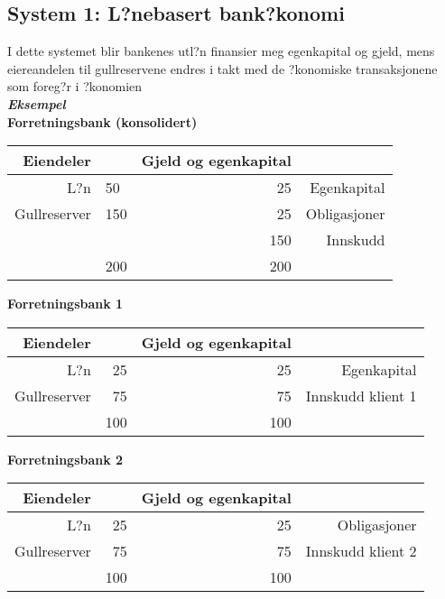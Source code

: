 \documentclass[a4paper,notitlepage]{article}
\begin{document}
\subsection{System 1: L?nebasert bank?konomi}
I dette systemet blir bankenes utl?n finansier meg egenkapital og gjeld, mens eiereandelen til gullreservene endres i takt med de ?konomiske transaksjonene som foreg?r i ?konomien  \\

\noindent\textbf{\emph{Eksempel}}\\
\textbf{Forretningsbank (konsolidert)}
\begin{center}\begin{tabular}{rlrr}
    \textbf{Eiendeler} & \textbf{} & \textbf{Gjeld og egenkapital} & \textbf{} \\
\hline    L?n   & 50    & 25    & Egenkapital \\
    Gullreserver  &  150   & 25    & Obligasjoner \\
          &       & 150   & Innskudd \\
\hline          & 200   & 200   &  \\
\end{tabular}%
\end{center}
\noindent \textbf{Forretningsbank 1}
\begin{center}
\begin{tabular}{rrrr}
    \textbf{Eiendeler} & \textbf{} & \textbf{Gjeld og egenkapital} & \textbf{} \\
\hline    L?n   & 25    & 25    & Egenkapital \\
    Gullreserver & 75    & 75    & Innskudd klient 1 \\
\hline          & 100    & 100    &  \\
\end{tabular}%
\end{center}
\noindent \textbf{Forretningsbank 2}
\begin{center}

\begin{tabular}{rrrr}
    \textbf{Eiendeler} & \textbf{} & \textbf{Gjeld og egenkapital} & \textbf{} \\
\hline    L?n   & 25    & 25    & Obligasjoner \\
    Gullreserver & 75    & 75    & Innskudd klient 2 \\
\hline          & 100    & 100    &  \\
\end{tabular}%
\end{center}
\end{document}
